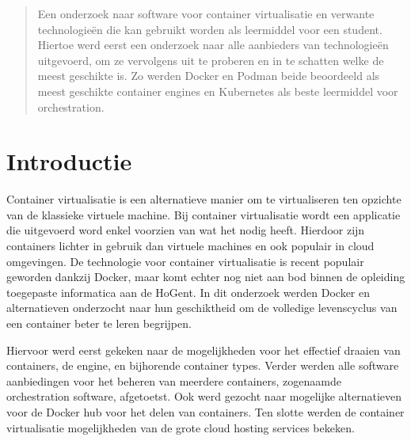 \documentclass[a0,portrait]{a0poster}
\begin{document}
\begin{multicols}{2} %


\color{HoGentAccent1} %

\begin{abstract}
Een onderzoek naar software voor container virtualisatie en verwante technologieën die kan gebruikt worden als leermiddel voor een student. Hiertoe werd eerst een onderzoek naar alle aanbieders van technologieën uitgevoerd, om ze vervolgens uit te proberen en in te schatten welke de meest geschikte is. Zo werden Docker en Podman beide beoordeeld als meest geschikte container engines en Kubernetes als beste leermiddel voor orchestration.
\end{abstract}

\color{HoGentAccent1} 
\section*{Introductie}
\color{black}
\color{black}
Container virtualisatie is een alternatieve manier om te virtualiseren ten opzichte van de klassieke virtuele machine. Bij container virtualisatie wordt een applicatie die uitgevoerd word enkel voorzien van wat het nodig heeft. Hierdoor zijn containers lichter in gebruik dan virtuele machines en ook populair in cloud omgevingen. De technologie voor container virtualisatie is recent populair geworden dankzij Docker, maar komt echter nog niet aan bod binnen de opleiding toegepaste informatica aan de HoGent. In dit onderzoek werden Docker en alternatieven onderzocht naar hun geschiktheid om de volledige levenscyclus van een container beter te leren begrijpen.

Hiervoor werd eerst gekeken naar de mogelijkheden voor het effectief draaien van containers, de engine, en bijhorende container types. Verder werden alle software aanbiedingen voor het beheren van meerdere containers, zogenaamde orchestration software, afgetoetst. Ook werd gezocht naar mogelijke alternatieven voor de Docker hub voor het delen van containers. Ten slotte werden de container virtualisatie mogelijkheden van de grote cloud hosting services bekeken.


\end{multicols}
\end{document}

